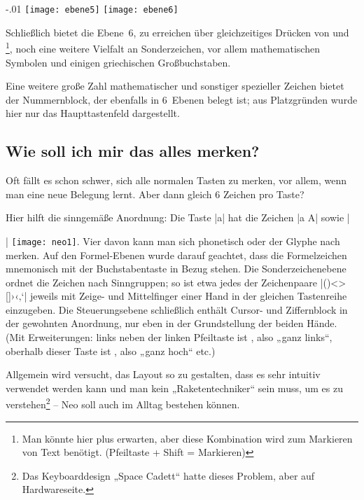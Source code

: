 \documentclass[ngerman]{dtk}
\newcommand{\taste}[1]{\makebox{\textsf{#1}}}
\begin{document}
{\begin{center}
\leavevmode\kern-.01\textwidth%
\texttt{[image: ebene5]}
\texttt{[image: ebene6]}
\end{center}

Schließlich bietet die Ebene~6, zu erreichen über gleichzeitiges Drücken von \taste{Mod 3} und \taste{Mod 4}\footnote{Man könnte hier \taste{Mod 2} plus \taste{Mod 4} erwarten, aber diese Kombination wird zum Markieren von Text benötigt. (Pfeiltaste + Shift = Markieren)}, noch eine weitere Vielfalt an Sonderzeichen, vor allem mathematischen Symbolen und einigen griechischen Großbuchstaben. 

Eine weitere große Zahl mathematischer und sonstiger spezieller Zeichen bietet der Nummernblock, der ebenfalls in 6~Ebenen belegt ist; aus Platzgründen wurde hier nur das Haupttastenfeld dargestellt.

\subsection{Wie soll ich mir das alles merken?}
Oft fällt es schon schwer, sich alle normalen Tasten zu merken, vor allem, wenn man eine neue Belegung lernt. Aber dann gleich 6 Zeichen pro Taste?

Hier hilft die sinngemäße Anordnung: Die Taste |a| hat die Zeichen |a A| sowie |{| \texttt{[image: neo1]}. Vier davon kann man sich phonetisch oder der Glyphe nach merken. Auf den Formel-Ebenen wurde darauf geachtet, dass die Formelzeichen mnemonisch mit der Buchstabentaste in Bezug stehen.  Die Sonderzeichenebene ordnet die Zeichen nach Sinngruppen; so ist etwa jedes der Zeichenpaare |()<>{}[]›‹‚‘| jeweils mit Zeige- und Mittelfinger einer Hand in der gleichen Tastenreihe einzugeben.  Die Steuerungsebene schließlich enthält Cursor- und Ziffernblock in der gewohnten Anordnung, nur eben in der Grundstellung der beiden Hände. (Mit Erweiterungen: links neben der linken Pfeiltaste ist \taste{Pos 1}, also „ganz links“, oberhalb dieser Taste ist \taste{Bild hoch}, also „ganz hoch“ etc.)

Allgemein wird versucht, das Layout so zu gestalten, dass es sehr intuitiv verwendet werden kann und man kein „Raketentechniker“ sein muss, um es zu verstehen\footnote{Das Keyboarddesign „Space Cadett“ hatte dieses Problem, aber auf Hardwareseite.} – Neo soll auch im Alltag bestehen können.

}}
\end{document}
